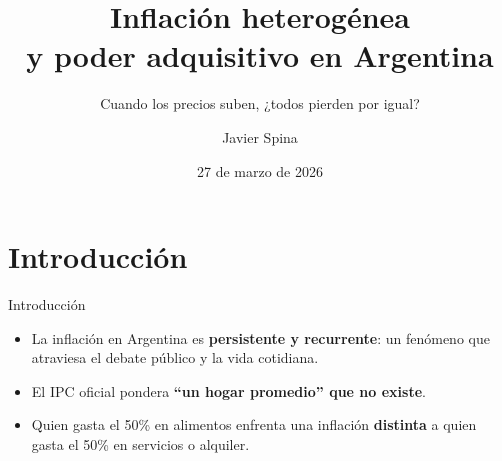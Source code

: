 \documentclass{beamer}
\title[Inflación y poder adquisitivo]{Inflación heterogénea\\y poder adquisitivo en Argentina}
\subtitle{Cuando los precios suben, ¿todos pierden por igual?}
\author{Javier Spina}
\institute{ECyT - UNSAM}
\date{27 de marzo de 2026}
\begin{document}
\begin{frame}
    \titlepage
\end{frame}





\section{Introducción}
\begin{frame}{Introducción}
    \begin{itemize}
        \item La inflación en Argentina es \textbf{persistente y recurrente}: un fenómeno que atraviesa el debate público y la vida cotidiana.
        \item El IPC oficial pondera \textbf{``un hogar promedio'' que no existe}.
        \item Quien gasta el 50\% en alimentos enfrenta una inflación 
        \textbf{distinta} a quien gasta el 50\% en servicios o alquiler.
    \end{itemize}
\end{frame}
\end{document}
